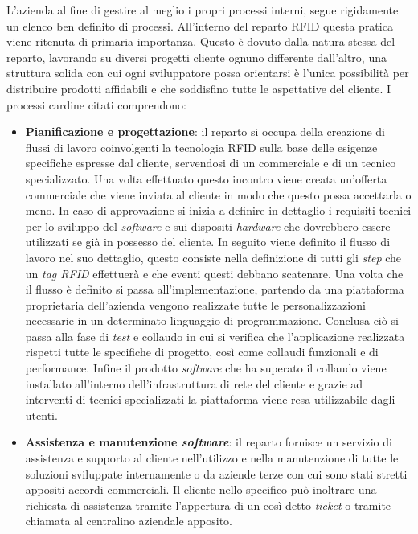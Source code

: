 L'azienda al fine di gestire al meglio i propri processi interni, segue rigidamente un elenco ben definito di processi. All'interno del reparto RFID questa
pratica viene ritenuta di primaria importanza. Questo è dovuto dalla natura stessa del reparto, lavorando su diversi progetti cliente ognuno differente 
dall'altro, una struttura solida con cui ogni sviluppatore possa orientarsi è l'unica possibilità per distribuire prodotti affidabili e che soddisfino
tutte le aspettative del cliente. I processi cardine citati comprendono:
\begin{itemize}
    \item \textbf{Pianificazione e progettazione}: il reparto si occupa della creazione di flussi di lavoro coinvolgenti la tecnologia RFID sulla base delle esigenze
    specifiche espresse dal cliente, servendosi di un commerciale e di un tecnico specializzato. Una volta effettuato questo incontro viene creata un'offerta
    commerciale che viene inviata al cliente in modo che questo possa accettarla o meno. In caso di approvazione si inizia a definire in dettaglio
    i requisiti tecnici per lo sviluppo del \emph{software} e sui dispositi \emph{hardware} che dovrebbero essere utilizzati se già in possesso del cliente.
    In seguito viene definito il flusso di lavoro nel suo dettaglio, questo consiste nella definizione di tutti gli \emph{step} che un \emph{tag RFID} 
    effettuerà e che eventi questi debbano scatenare. Una volta che il flusso è definito si passa all'implementazione, partendo da una piattaforma proprietaria dell'azienda 
    vengono realizzate tutte le personalizzazioni necessarie in un determinato linguaggio di programmazione.
    Conclusa ciò si passa alla fase di \emph{test} e collaudo in cui si verifica che l’applicazione realizzata rispetti tutte le specifiche 
    di progetto, così come collaudi funzionali e di performance.
    Infine il prodotto \emph{software} che ha superato il collaudo viene installato all'interno dell'infrastruttura di rete del cliente e grazie ad interventi
    di tecnici specializzati la piattaforma viene resa utilizzabile dagli utenti.
    \item \textbf{Assistenza e manutenzione \emph{software}}: il reparto fornisce un servizio di assistenza e supporto al cliente nell'utilizzo e nella manutenzione 
    di tutte le soluzioni sviluppate internamente o da aziende terze con cui sono stati stretti appositi accordi commerciali. Il cliente nello specifico può
    inoltrare una richiesta di assistenza tramite l'appertura di un così detto \emph{ticket} o tramite chiamata al centralino aziendale apposito.

\end{itemize}
